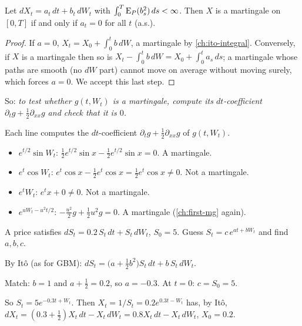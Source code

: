 \begin{theorem}
\label{thm:drift-zero}
Let $dX_t=a_t\,dt+b_t\,dW_t$ with $\int_0^T\operatorname{E}_P(b_s^2)\,ds<\infty$. Then $X$ is a martingale on $[0,T]$ if and only if $a_t=0$ for all $t$ (a.s.).
\end{theorem}
\begin{proof}
If $a=0$, $X_t=X_0+\int_0^tb\,dW$, a martingale by \cref{ch:ito-integral}. Conversely, if $X$ is a martingale then so is $X_t-\int_0^tb\,dW=X_0+\int_0^ta_s\,ds$; a martingale whose paths are smooth (no $dW$ part) cannot move on average without moving surely, which forces $a=0$. We accept this last step.
\end{proof}

So: \emph{to test whether $g(t,W_t)$ is a martingale, compute its $dt$-coefficient $\partial_tg+\frac12\partial_{xx}g$ and check that it is $0$.}

\begin{example}
\label{ex:mg-test}
Each line computes the $dt$-coefficient $\partial_tg+\frac12\partial_{xx}g$ of $g(t,W_t)$.
\begin{itemize}
  \item $e^{t/2}\sin W_t$: $\frac12e^{t/2}\sin x-\frac12e^{t/2}\sin x=0$. A martingale.
  \item $e^{t}\cos W_t$: $e^t\cos x-\frac12e^t\cos x=\frac12e^t\cos x\ne0$. Not a martingale.
  \item $e^tW_t$: $e^tx+0\ne0$. Not a martingale.
  \item $e^{uW_t-u^2t/2}$: $-\frac{u^2}2g+\frac12u^2g=0$. A martingale (\cref{ch:first-mg} again).
\end{itemize}
\end{example}

\begin{example}
\label{ex:guess}
A price satisfies $dS_t=0.2\,S_t\,dt+S_t\,dW_t$, $S_0=5$. Guess $S_t=c\,e^{at+bW_t}$ and find $a,b,c$.
\begin{steps}
  \item By Itô (as for GBM): $dS_t=\big(a+\frac12b^2\big)S_t\,dt+b\,S_t\,dW_t$.
  \item Match: $b=1$ and $a+\frac12=0.2$, so $a=-0.3$. At $t=0$: $c=S_0=5$.
  \item So $S_t=5e^{-0.3t+W_t}$. Then $X_t=1/S_t=0.2e^{0.3t-W_t}$ has, by Itô, $dX_t=(0.3+\frac12)X_t\,dt-X_t\,dW_t=0.8X_t\,dt-X_t\,dW_t$, $X_0=0.2$.
\end{steps}
\end{example}

